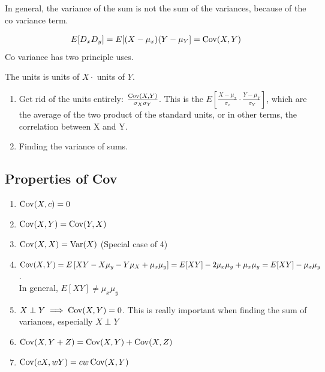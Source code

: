 \documentclass{report}
\begin{document}
In general, the variance of the sum is not the sum of the variances, because of the co variance term. 

\[
E[D_{x}D_{y}] = E[(X - \mu _{x})(Y-\mu_{Y}] = \operatorname{Cov}(X,Y)
\]
Co variance has two principle uses. 

The units is units of $ X \cdot $ units of $ Y $. 

\begin{enumerate}
	\item Get rid of the units entirely: $ \frac{\operatorname{Cov}(X,Y)}{\sigma_{X}\sigma_{Y}}$. This is the $ E\left[\frac{X-\mu _{x}}{\sigma_{x}} \cdot \frac{Y-\mu _{Y}}{\sigma_{Y}} \right]$, which are the average of the two product of the standard units, or in other terms, the correlation between X and Y.
	\item Finding the variance of sums.
\end{enumerate}

\subsection{Properties of Cov}
\begin{enumerate}
	\item $ \operatorname{Cov}(X,c) = 0 $ 
	\item $ \operatorname{Cov}(X,Y) = \operatorname{Cov}(Y,X) $ 
	\item $ \operatorname{Cov}(X, X) = \operatorname{Var}(X) $ (Special case of 4) 
	\item $ \operatorname{Cov}(X,Y) = E\left[XY - X\mu _{y} - Y\mu _{X} + \mu _{x}\mu _{y} \right]= E[XY] -2\mu _{x}\mu _{y} +\mu _{x}\mu _{y} = E[XY] - \mu _{x}\mu _{y} $. \\ In general, $ E[XY] \neq \mu _{x}\mu_{y} $ 
	\item $ X \perp Y \implies \operatorname{Cov}(X,Y) = 0  $. This is really important when finding the sum of variances, especially $ X \perp Y $ 
	\item $ \operatorname{Cov}(X, Y+Z) = \operatorname{Cov}(X, Y) + \operatorname{Cov}(X,Z) $ 
	\item $ \operatorname{Cov}(cX, wY) = cw\operatorname{Cov}(X,Y) $
\end{enumerate}


\end{document}

